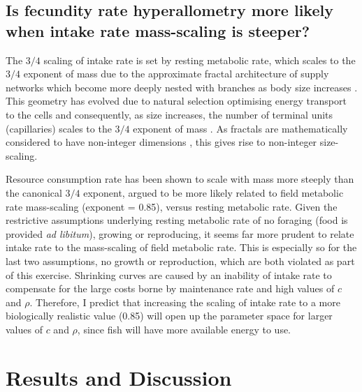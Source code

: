 \documentclass[a4paper]{article} %
\begin{document}
\subsection{Is fecundity rate hyperallometry more likely when intake rate mass-scaling is steeper?}

The $3/4$ scaling of intake rate is set by resting metabolic rate, which scales to the $3/4$ exponent of mass \autocite{Kleiber1947, peters1983, niklas1994plant} due to the approximate fractal architecture of supply networks which become more deeply nested with branches as body size increases \autocite{West1997}. This geometry has evolved due to natural selection optimising energy transport to the cells and consequently, as size increases, the number of terminal units (capillaries) scales to the $3/4$ exponent of mass \autocite{West1997, West2005}. As fractals are mathematically considered to have non-integer dimensions \autocite{Hausdorff1918, Mandelbrot1982}, this gives rise to non-integer size-scaling. 

Resource consumption rate has been shown to scale with mass more steeply than the canonical $3/4$ exponent, argued to be more likely related to field metabolic rate mass-scaling (exponent = 0.85), versus resting metabolic rate. Given the restrictive assumptions underlying resting metabolic rate of no foraging (food is provided \textit{ad libitum}), growing or reproducing, it seems far more prudent to relate intake rate to the mass-scaling of field metabolic rate. This is especially so for the last two assumptions, no growth or reproduction, which are both violated as part of this exercise. Shrinking curves are caused by an inability of intake rate to compensate for the large costs borne by maintenance rate and high values of $c$ and $\rho$. Therefore, I predict that increasing the scaling of intake rate to a more biologically realistic value (0.85) will open up the parameter space for larger values of $c$ and $\rho$, since fish will have more available energy to use.

\section{Results and Discussion}\thispagestyle{plain}
\end{document}
